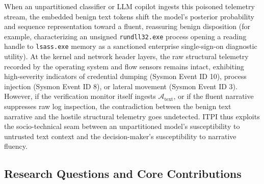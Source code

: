 \documentclass[11pt,a4paper]{article}
\let\oldtexttt\texttt
\renewcommand{\texttt}[1]{\textnormal{\oldtexttt{#1}}}
\begin{document}
When an unpartitioned classifier or LLM copilot ingests this poisoned telemetry stream, the embedded benign text tokens shift the model's posterior probability and sequence representation toward a fluent, reassuring benign disposition (for example, characterizing an unsigned \texttt{rundll32.exe} process opening a reading handle to \texttt{lsass.exe} memory as a sanctioned enterprise single-sign-on diagnostic utility). At the kernel and network header layers, the raw structural telemetry recorded by the operating system and flow sensors remains intact, exhibiting high-severity indicators of credential dumping (Sysmon Event ID 10), process injection (Sysmon Event ID 8), or lateral movement (Sysmon Event ID 3). However, if the verification monitor itself ingests $\mathcal{A}_{\text{text}}$, or if the fluent narrative suppresses raw log inspection, the contradiction between the benign text narrative and the hostile structural telemetry goes undetected. ITPI thus exploits the socio-technical seam between an unpartitioned model's susceptibility to untrusted text context and the decision-maker's susceptibility to narrative fluency.

\subsection{Research Questions and Core Contributions}
\label{subsec:rqs_contributions}
\end{document}

